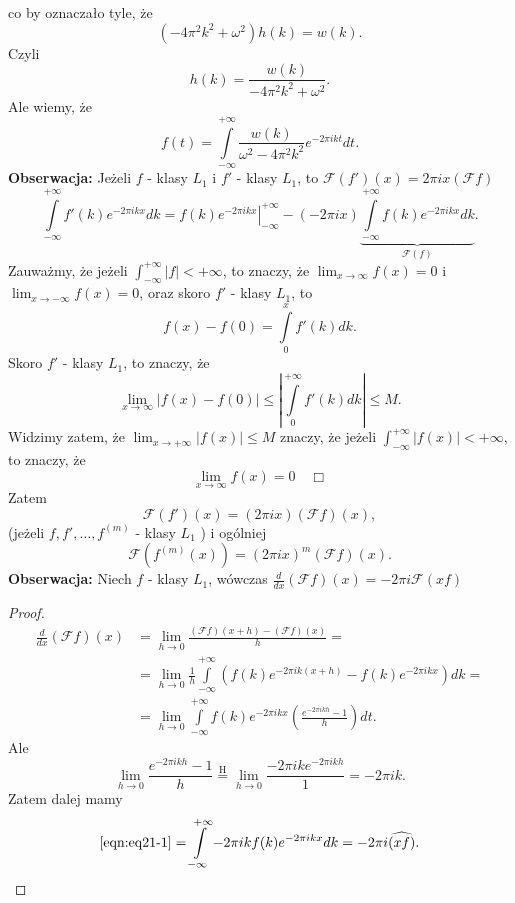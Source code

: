 \documentclass[../main.tex]{subfiles}
\begin{document}
co by oznaczało tyle, że
\[
    \left(-4 \pi^2 k^2 + \omega^2\right)h(k) = w(k)
.\]
Czyli
\[
    h(k) = \frac{w(k)}{-4\pi^2 k^2 + \omega^2}
.\]
Ale wiemy, że
\[
    f(t) = \int\limits_{-\infty}^{+\infty}\frac{w(k)}{\omega^2 - 4 \pi^2 k^2}e^{-2\pi i kt}dt
.\]
\textbf{Obserwacja: }Jeżeli $f$ - klasy $L_1$ i $f'$ - klasy $L_1$, to $\mathcal{F}\left(f'\right)(x) = 2\pi i x (\mathcal{F}f)$
\[
    \int\limits_{-\infty}^{+\infty}f'(k)e^{-2\pi i kx}dk = \left. f(k)e^{-2 \pi i kx} \right|_{-\infty}^{+\infty} - \left( -2\pi i x \right) \underbrace{\int\limits_{-\infty}^{+\infty}f(k)e^{-2\pi i kx}dk}_{\mathcal{F}(f)}
.\]
Zauważmy, że jeżeli $\int_{-\infty}^{+\infty}|f| < +\infty$, to znaczy, że $\lim_{x \to \infty}f(x) = 0$ i $\lim_{x \to -\infty}f(x) = 0$, oraz skoro $f'$ - klasy $L_1$, to
\[
    f(x) - f(0) = \int\limits_{0}^x f'(k)dk
.\]
Skoro $f'$ - klasy $L_1$, to znaczy, że
\[
    \lim_{x \to \infty}\left| f(x) - f(0) \right| \le \left| \int\limits_{0}^{+\infty}f'(k)dk \right| \le M
.\]
Widzimy zatem, że $\lim_{x \to +\infty}\left| f(x) \right| \le M$ znaczy, że jeżeli $\int_{-\infty}^{+\infty}|f(x)| < +\infty$, to znaczy, że
\[\lim_{x \to \infty}f(x) = 0\quad \Box\]
Zatem
\[
    \mathcal{F}\left( f' \right) (x) = (2\pi i x)(\mathcal{F}f)(x)
,\]
(jeżeli $f,f',\ldots,f^{(m)}$ - klasy $L_1$ ) i ogólniej
\[
    \mathcal{F}(f^{(m)}(x)) = \left( 2\pi i x \right) ^m (\mathcal{F}f)(x)
.\]
\textbf{Obserwacja: }Niech $f$ - klasy $L_1$, wówczas $\frac{d}{dx} \left( \mathcal{F}f \right) (x) = -2\pi i \mathcal{F}(xf)$
\begin{proof}
    \begin{align*}
        \frac{d}{dx}\left( \mathcal{F}f \right) (x) &= \lim_{h \to 0}\frac{(\mathcal{F}f)(x+h) - (\mathcal{F}f)(x)}{h} =\\
        &= \lim_{h \to 0}\frac{1}{h}\int\limits_{-\infty}^{+\infty}\left( f(k)e^{-2\pi i k(x+h)} - f(k)e^{-2\pi i kx} \right)dk =\\
        \label{eqn:eq21-1}
        &= \lim_{h \to 0}\int\limits_{-\infty}^{+\infty}f(k)e^{-2\pi i k x}\left( \frac{e^{-2\pi i k h} - 1}{h} \right) dt\tag{$\star$}
    .\end{align*}
Ale
\[
    \lim_{h \to 0}\frac{e^{-2\pi i k h} - 1}{h} \overset{\text{H}}{=} \lim_{h \to 0} \frac{-2\pi i ke^{-2\pi i kh}}{1} = -2\pi i k
.\]
Zatem dalej mamy
\[
    \eqref{eqn:eq21-1} = \int\limits_{-\infty}^{+\infty}-2\pi i k f(k)e^{-2\pi i kx}dk = -2\pi i \widehat{\left( xf \right) }
.\]
\end{proof}
\end{document}
